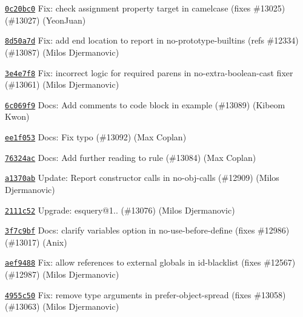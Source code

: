 \begin{DoxyItemize}
\item \href{https://github.com/eslint/eslint/commit/0c20bc068e608869981a10711bba88ffde1539d8}{\texttt{ {\ttfamily 0c20bc0}}} Fix\+: check assignment property target in camelcase (fixes \#13025) (\#13027) (Yeon\+Juan)
\item \href{https://github.com/eslint/eslint/commit/8d50a7d82244d4912f3eab62a66c81c76c44a9da}{\texttt{ {\ttfamily 8d50a7d}}} Fix\+: add end location to report in no-\/prototype-\/builtins (refs \#12334) (\#13087) (Milos Djermanovic)
\item \href{https://github.com/eslint/eslint/commit/3e4e7f8d429dc70b78c0aefaa37f9c22a1e5fc0f}{\texttt{ {\ttfamily 3e4e7f8}}} Fix\+: incorrect logic for required parens in no-\/extra-\/boolean-\/cast fixer (\#13061) (Milos Djermanovic)
\item \href{https://github.com/eslint/eslint/commit/6c069f907a04268b671c7f949c04a508df9d42a3}{\texttt{ {\ttfamily 6c069f9}}} Docs\+: Add comments to code block in example (\#13089) (Kibeom Kwon)
\item \href{https://github.com/eslint/eslint/commit/ee1f0531aa534ef9182cf8586f55ad82aaa55e75}{\texttt{ {\ttfamily ee1f053}}} Docs\+: Fix typo (\#13092) (Max Coplan)
\item \href{https://github.com/eslint/eslint/commit/76324ace67893c3d7e38a369114d6128df9ffb65}{\texttt{ {\ttfamily 76324ac}}} Docs\+: Add further reading to rule (\#13084) (Max Coplan)
\item \href{https://github.com/eslint/eslint/commit/a1370abed72e1fb93e601816d981fa6e46204afb}{\texttt{ {\ttfamily a1370ab}}} Update\+: Report constructor calls in no-\/obj-\/calls (\#12909) (Milos Djermanovic)
\item \href{https://github.com/eslint/eslint/commit/2111c52443e7641caad291e0daaea8e2fe6c4562}{\texttt{ {\ttfamily 2111c52}}} Upgrade\+: esquery@1.. (\#13076) (Milos Djermanovic)
\item \href{https://github.com/eslint/eslint/commit/3f7c9bf19615122fb776cdd13da532d860bd945a}{\texttt{ {\ttfamily 3f7c9bf}}} Docs\+: clarify variables option in no-\/use-\/before-\/define (fixes \#12986) (\#13017) (Anix)
\item \href{https://github.com/eslint/eslint/commit/aef9488c07d3da4becff6e8d6918824b53086d86}{\texttt{ {\ttfamily aef9488}}} Fix\+: allow references to external globals in id-\/blacklist (fixes \#12567) (\#12987) (Milos Djermanovic)
\item \href{https://github.com/eslint/eslint/commit/4955c50dc9e89b4077b28e35f065d45e89bdccd7}{\texttt{ {\ttfamily 4955c50}}} Fix\+: remove type arguments in prefer-\/object-\/spread (fixes \#13058) (\#13063) (Milos Djermanovic)

\end{DoxyItemize}
